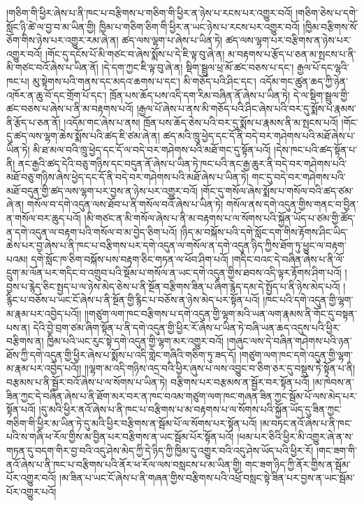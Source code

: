 །གཅིག་གི་ཕྱིར་ཞེས་པ་ནི་ཁང་པ་བརྩིགས་པ་གཅིག་གི་ཕྱིར་ན་ཉེས་པ་རངས་པར་འགྱུར་བའོ། །གཅིག་ཅེས་པ་དགེ་སློང་ཉི་ཚེ་ལ་བྱ་བ་མ་ཡིན་གྱི། ཁྱིམ་པ་གཅིག་ཅིག་གི་ཕྱིར་ན་ཡང་ཉེས་པ་རངས་པར་འགྱུར་བའོ། །ཁྱིམ་བརྩིགས་སོ་ཅོག་གིས་ཉེས་པར་འགྱུར་རམ་ཞེ་ན། ཚད་ལས་ལྷག་པ་ཞེས་པ་ཡིན་ཏེ། ཚད་ལས་ལྷག་པར་བརྩིགས་ན་ཉེས་པར་འགྱུར་བའོ། །གོང་དུ་དངོས་པོ་མི་གཙང་བ་ཞེས་སྨོས་པ་དེ་ཇི་ལྟ་བུ་ཞེ་ན། མ་བརྟགས་པ་རྩོད་པ་ཅན་མ་སྤངས་པ་ནི་མི་གཙང་བའོ་ཞེས་པ་ཡིན་ནོ། །དེ་དག་ཀྱང་ཇི་ལྟ་བུ་ཞེ་ན། སྡིག་སྦྲུལ་ཕྲ་མོ་ཚང་བཅས་པ་དང་། རྒྱལ་པོ་དང་ལྷའི་ཁང་པ། མུ་སྟེགས་པའི་གནས་དང་མདའ་ཆགས་པ་དང་། མི་གཅོད་པའི་ཤིང་དང་། འདོམ་གང་ཚུན་ཆད་ཀྱི་ཉེན་འཁོར་ན་ཆུ་བོ་དང་གྲོག་པོ་དང་། ཁྲོན་པས་ཆོད་པས་འདི་དག་རིམ་བཞིན་ནོ་ཞེས་པ་ཡིན་ཏེ། དེ་ལ་སྡིག་སྦྲུལ་གྱི་ཚང་བཅས་པ་ཞེས་པ་ནི་མ་བརྟགས་པའོ། །རྒྱལ་པོ་ཞེས་པ་ནས་མི་གཅོད་པའི་ཤིང་ཞེས་པའི་བར་དུ་སྨོས་པ་རྣམས་ནི་རྩོད་པ་ཅན་ནོ། །འདོམ་གང་ཞེས་པ་ནས། ཁྲོན་པས་ཆོད་ཅེས་པའི་བར་དུ་སྨོས་པ་རྣམས་ནི་མ་སྤངས་པའོ། །གོང་དུ་ཚད་ལས་ལྷག་ཆེས་སྨོས་པའི་ཚད་ཇི་ཙམ་ཞེ་ན། ཚད་མའི་ཁྲུ་ཕྱེད་དང་དོ་ནི་བདེ་བར་གཤེགས་པའི་མཐོ་ཞེས་པ་ཡིན་ཏེ། མི་ཐ་མལ་བའི་ཁྲུ་ཕྱེད་དང་དོ་ལ་བདེ་བར་གཤེགས་པའི་མཐོ་གང་དུ་སྟོན་པའོ། །དེས་ཁང་པའི་ཚད་སྟོན་པ་ནི། ནང་རྒྱའི་ཚད་དེའི་བཅུ་གཉིས་དང་བདུན་ནོ་ཞེས་པ་ཡིན་ཏེ་ཁང་པའི་ནང་རྒྱ་ཆུར་ནི་བདེ་བར་གཤེགས་པའི་མཐོ་བཅུ་གཉིས་ཞེས་ཕྱེད་དང་དོ་ནི་བདེ་བར་གཤེགས་པའི་མཐོ་ཞེས་པ་ཡིན་ཏེ། གང་དུ་བདེ་བར་གཤེགས་པའི་མཐོ་བདུན་གྱི་ཚད་ལས་ལྷག་པར་བྱས་ན་ཉེས་པར་འགྱུར་བའོ། །གོང་དུ་གསོལ་ཞེས་སྨོས་པ་གསོལ་བའི་ཚད་ཙམ་ཞེ་ན། གསོལ་བ་དགེ་འདུན་ལས་ཐོབ་པ་ནི་གསོལ་བའོ་ཞེས་པ་ཡིན་ཏེ། གསོལ་ནས་དགེ་འདུན་གྱིས་གནང་བ་བྱིན་ན་གསོལ་བར་ཆུད་པའོ། །མི་གཙང་ན་མི་གསོལ་ཞེས་པ་ནི་མ་བརྟགས་པ་ལ་སོགས་པའི་སྐྱོན་ཡོད་པ་ཙམ་གྱི་ཚོད་ན་དགེ་འདུན་ལ་བརྟག་པའི་གསོལ་བ་མ་བྱེད་ཅིག་པའོ། །ཉིད་མ་བསྐོས་པའི་དགེ་སློང་དག་གིས་རྟོགས་ཤིང་ཡིད་ཆེས་པར་བྱ་ཞེས་པ་ནི་ཁང་པ་བརྩིགས་པར་དགེ་འདུན་ལ་གསོལ་ན་དགེ་འདུན་ཉིད་ཀྱིས་ཐོག་ཏུ་ཕྱུང་ལ་བརྟག་པའམ། དགེ་སློང་ཁ་ཅིག་བསྐོས་པས་བརྟག་ཅིང་གཏན་ལ་ཕོབ་ཤིག་པའོ། །གདིང་བའང་དེ་བཞིན་ཞེས་པ་ནི་ལོ་དྲུག་མ་ལོན་པར་གདིང་བ་འགྲུབ་པའི་སྡོམ་པ་གསོལ་ན་ཡང་དགེ་འདུན་གྱིས་ཐབས་འདི་ལྟར་རྟོགས་ཤིག་པའོ། །བྱས་པ་རྙེད་ཅིང་སྤྱད་པ་ལ་ཉེས་མེད་ཅེས་པ་ནི་སྔོན་བརྩིགས་ཟིན་པ་ཞིག་རྙེད་དམ་དེ་སྤྱོད་པ་ནི་ཉེས་མེད་པའོ། །རྙིང་པ་བཅོས་པ་ཡང་ངོ་ཞེས་པ་ནི་སྔོན་གྱི་རྙིང་པ་བཅོས་ན་ཉེས་མེད་པར་སྟོན་པའོ། །ཁང་པའི་དགེ་འདུན་གྱི་ལྷག་མ་རྣམ་པར་འབྱེད་པའོ།། །།གཙུག་ལག་ཁང་བརྩིགས་པ་དགེ་འདུན་གྱི་ལྷག་མའི་ཡན་ལག་རྣམས་ནི་གོང་དུ་བསྟན་པས་ན། དེའི་བྱེ་བྲག་ཙམ་ཞིག་སྟོན་པ་ནི་དགེ་འདུན་གྱི་ཕྱིར་རོ་ཞེས་པ་ཡིན་ཏེ་བཞི་ཡན་ཆད་འདུས་པའི་ཕྱིར་བརྩིགས་ན། ཁྱིམ་པའི་ཡང་རུང་སྟེ་དགེ་འདུན་གྱི་ལྷག་མར་འགྱུར་བའོ། །གཞུང་ལས་དེ་བཞིན་གཤེགས་པའི་ཉན་ཐོས་ཀྱི་དགེ་འདུན་གྱི་ཕྱིར་ཞེས་པ་སྨོས་པ་འདི་གླེང་གཞིའི་གཅིག་ཏུ་ཟད་དོ། །གཙུག་ལག་ཁང་དགེ་འདུན་གྱི་ལྷག་མ་རྣམ་པར་འབྱེད་པའོ།། །།ལྷག་མ་འདི་གཉིས་འདྲ་བའི་ཕྱིར་ཞུས་པ་ལས་འབྱུང་བ་ཅིག་ཅར་དུ་བསྡུས་ཏེ་སྟོན་པ་ནི། བརྩམས་པ་ནི་སྦྱོར་བའོ་ཞེས་པ་ལ་སོགས་པ་ཡིན་ཏེ། བརྩིགས་པར་བརྩམས་ན་སྦྱོར་བར་སྟོན་པའོ། །མ་ཁེབས་ན་ཟིན་ཀྱང་དེ་བཞིན་ཞེས་པ་ནི་ཐོག་མར་བར་ན་ཁང་བའམ་གཙུག་ལག་ཁང་གཞན་ཟིན་ཀྱང་སྦོམ་པོ་ལས་མེད་པར་སྟོན་པའོ། །དུ་མའི་ཕྱིར་ནའོ་ཞེས་པ་ནི་ཁང་པ་བརྩིགས་པ་མ་བརྟགས་པ་ལ་སོགས་པའི་སྐྱོན་ཡོད་དུ་ཟིན་ཀྱང་གཅིག་གི་ཕྱིར་མ་ཡིན་ཏེ་དུ་མའི་ཕྱིར་བརྩིགས་ན་སྦོམ་པོ་ལ་སོགས་པར་སྟོན་པའོ། །མ་བཏང་ནའོ་ཞེས་པ་ནི་ཁང་པའི་ས་གཞི་ཕ་རོལ་གྱིས་མ་བྱིན་པར་བརྩིགས་ན་ཡང་སྦོམ་པོར་སྟོན་པའོ། །ཕམ་པར་ཅིའི་ཕྱིར་མི་འགྱུར་ཞེ་ན་ས་གཏན་དུ་བདག་གིར་བྱ་བའི་འདུ་ཤེས་མེད་ཀྱི་དེ་ཉིད་ཀྱི་ཁྱིམ་དུ་འགྱུར་བའི་འདུ་ཤེས་ཡོད་པའི་ཕྱིར་རོ། །གང་ཟག་གི་ནའོ་ཞེས་པ་ནི་ཁང་པ་བརྩིགས་པའི་ནོར་ཕ་རོལ་ལས་བསླངས་པ་མ་ཡིན་གྱི། གང་ཟག་ཉིད་ཀྱི་ནོར་གྱིས་ན་སྦོམ་པོར་འགྱུར་བའོ། །མ་ཟིན་པ་ཡང་ངོ་ཞེས་པ་ནི་གཞན་གྱིས་བརྩིགས་པའི་འཕྲོ་བསླང་སྟེ་ཟིན་པར་བྱས་ན་ཡང་སྦོམ་པོར་འགྱུར་པའོ། 